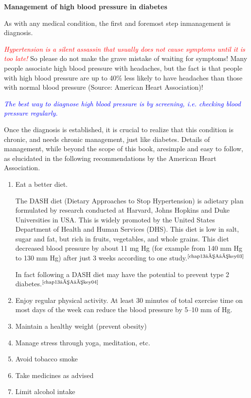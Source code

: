 \clearpage
\noindent\textbf{Management of high blood pressure in diabetes}

As with any medical condition, the first and foremost step in\break management is diagnosis.

\textcolor{red}{\textit{Hypertension is a silent assassin that usually does not cause symptoms until it is too late!}} So please do not make the grave mistake of wai\-ting for symptoms! Many people associate high blood pressure with headaches, but the fact is that people with high blood pressure are up to 40\% less likely to have headaches than those with normal blood pre\-ssure (Source: American Heart Association)!

\textcolor{blue}{\textit{The best way to diagnose high blood pressure is by screening, i.e. checking blood pressure regularly.}}

Once the diagnosis is established, it is crucial to realize that this condition is chronic, and needs chronic management, just like diabetes. Details of management, while beyond the scope of this book, are\break simple and easy to follow, as elucidated in the following recommenda\-tions by the American Heart Association.

\begin{enumerate}
\itemsep=0pt
\item Eat a better diet.
 
The DASH diet (Dietary Approaches to Stop Hypertension) is a\break dietary plan formulated by research conducted at Harvard, Johns Hopkins and Duke Universities in USA. This is widely promoted by the United States Department of Health and Human Services (DHS). This diet is low in salt, sugar and fat, but rich in fruits, vege\-tables, and whole grains. This diet decreased blood pressure by about 11 mg Hg (for example from 140 mm Hg to 130 mm Hg) after just 3 weeks according to one study.$^{\text{\cite{chap13–A–key03}}}$

 In fact following a DASH diet may have the potential to prevent type 2 diabetes.$^{\text{\cite{chap13–A–key04}}}$
\item Enjoy regular physical activity. At least 30 minutes of total exercise time on most days of the week can reduce the blood pressure by 5–10 mm of Hg.
\item Maintain a healthy weight (prevent obesity)
\item Manage stress through yoga, meditation, etc.
\item Avoid tobacco smoke
\item Take medicines as advised
\item Limit alcohol intake
\end{enumerate}

